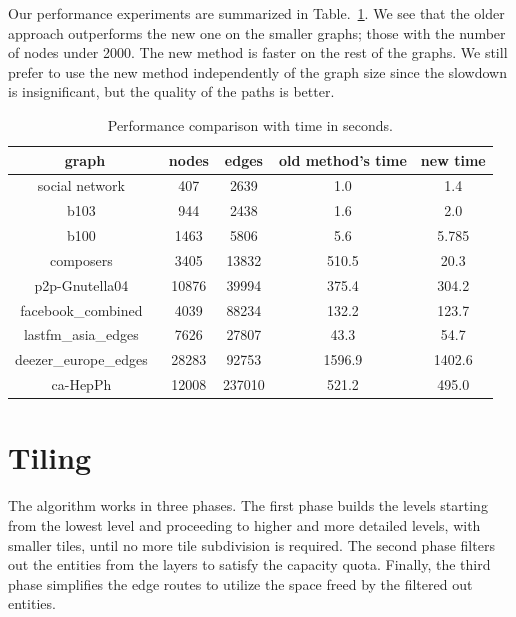 \documentclass{gd-llncs}
\begin{document}
{Our performance experiments are summarized in Table.~\ref{tab:perf}. We see that the older approach outperforms the new one on the smaller graphs;
those with the number of nodes under 2000. The new method is faster on the rest of the graphs.
We still prefer to use the new method independently of the graph size since the slowdown is insignificant, but the quality of the paths is better.

\begin{table}
  \begin{center}
    \begin{tabular}{||c |c| c| c| c||}
      \hline
      graph                                   & nodes & edges  & old method's time & new time \\ [0.5ex]
      \hline\hline
      social network~\cite{beveridge2018game} & 407   & 2639   & 1.0               & 1.4      \\
      \hline
      b103~\cite{b103}                        & 944   & 2438   & 1.6               & 2.0      \\
      \hline
      b100~\cite{b100}                        & 1463  & 5806   & 5.6               & 5.785    \\
      \hline
      composers~\cite{composers}              & 3405  & 13832  & 510.5             & 20.3     \\
      \hline
      p2p-Gnutella04~\cite{gnutella}          & 10876 & 39994  & 375.4             & 304.2    \\
      \hline
      facebook\_combined~\cite{fb}            & 4039  & 88234  & 132.2             & 123.7    \\
      \hline
      lastfm\_asia\_edges~\cite{feather}      & 7626  & 27807  & 43.3              & 54.7     \\
      \hline
      deezer\_europe\_edges~\cite{feather}    & 28283 & 92753  & 1596.9            & 1402.6   \\
      \hline
      ca-HepPh~\cite{leskovec2007graph}       & 12008 & 237010 & 521.2             & 495.0    \\
      \hline
    \end{tabular}
    \caption{Performance comparison with time in seconds.}
    \label{tab:perf}
  \end{center}

\end{table}
\section{Tiling}
The algorithm works in three phases. The first phase builds the levels starting from the lowest level and proceeding to higher and more detailed levels, with smaller tiles, until no more tile subdivision is required. The second phase filters out the entities from the layers to satisfy the capacity quota. Finally, the third phase simplifies the edge routes to utilize the space freed by the filtered out entities.


}
\end{document}
